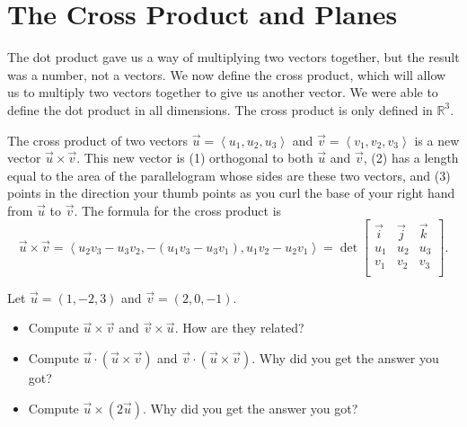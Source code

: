\section{The Cross Product and Planes}

The dot product gave us a way of multiplying two vectors together, but the result was a number, not a vectors. We now define the cross product, which will allow us to multiply two vectors together to give us another vector.  We were able to define the dot product in all dimensions.  The cross product is only defined in $\mathbb{R}^3$. 

\begin{definition}
The cross product of two vectors $\vec u = \left<u_1,u_2,u_3\right>$ and $\vec v = \left<v_1,v_2,v_3\right>$ is a new vector $\vec u\times \vec v$. This new vector is (1) orthogonal to both $\vec u$ and $\vec v$, (2) has a length equal to the area of the parallelogram whose sides are these two vectors, and (3) points in the direction your thumb points as you curl the base of your right hand from $\vec u$ to $\vec v$. The formula for the cross product is $$\vec u\times \vec v = \left<u_2v_3-u_3v_2,-(u_1v_3-u_3v_1),u_1v_2-u_2v_1\right> = \det\begin{bmatrix}\vec i & \vec j&\vec k\\ u_1&u_2&u_3\\ v_1&v_2&v_3\\\end{bmatrix}.$$
\end{definition}

\begin{problem}  
%
Let $\vec u=(1,-2,3)$ and $\vec v=(2,0,-1)$.  
\begin{itemize}
\item Compute $\vec u\times \vec v$ and $\vec v\times \vec u$.  How are they related?
\item Compute $\vec u \cdot (\vec u\times \vec v)$ and $\vec v \cdot (\vec u\times \vec v)$. Why did you get the answer you got?
\item Compute $\vec u \times (2\vec u)$.  Why did you get the answer you got?
\end{itemize}
\end{problem}

